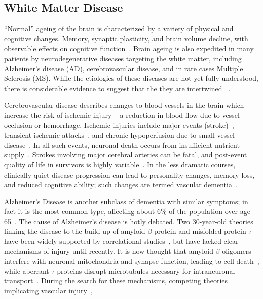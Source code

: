 \subsection{White Matter Disease}\label{ss:WMD}
``Normal'' ageing of the brain is characterized by a variety of physical and cognitive changes.
Memory, synaptic plasticity, and brain volume decline,
with observable effects on cognitive function~\cite{Peters2006,Good2002}.
Brain ageing is also expedited in many patients by neurodegenerative diseases
targeting the white matter, including
Alzheimer's disease (AD), cerebrovascular disease, and in rare cases Multiple Sclerosis (MS).
While the etiologies of these diseases are not yet fully understood,
there is considerable evidence to suggest that the they are intertwined
~\cite{Debette2010,Conklin2014,Heppner2015,Snyder2015}.
\par
Cerebrovascular disease describes changes to blood vessels in the brain which increase the risk of
ischemic injury -- a reduction in blood flow due to vessel occlusion or hemorrhage.
Ischemic injuries include
major events (stroke)~\cite{VanderWorp2007},
transient ischemic attacks~\cite{Albers2002}, and
chronic hypoperfusion due to small vessel disease~\cite{Pantoni2010}.
In all such events, neuronal death occurs from insufficient nutrient supply~\cite{VanderWorp2007}.
Strokes involving major cerebral arteries can be fatal,
and post-event quality of life in survivors is highly variable~\cite{Prabhakaran2015}.
In the less dramatic courses, clinically quiet disease progression can lead to
personality changes, memory loss, and reduced cognitive ability;
such changes are termed vascular dementia~\cite{Roman1993}.
\par
Alzheimer's Disease is another subclass of dementia with similar symptoms;
in fact it is the most common type,
affecting about 6\% of the population over age 65~\cite{Burns2009}.
The cause of Alzheimer's disease is hotly debated.
Two 30-year-old theories linking the disease to
the build up of amyloid $\beta$ protein and misfolded protein $\tau$
have been widely supported by correlational studies~\cite{Masters1985,Hardy2002,Lee2011},
but have lacked clear mechanisms of injury until recently.
It is now thought that amyloid $\beta$ oligomers interfere with
neuronal mitochondria and synapse function, leading to cell death~\cite{Kim2013,Tu2014},
while aberrant $\tau$ proteins disrupt microtubules
necessary for intraneuronal transport~\cite{Lee2011}.
During the search for these mechanisms, competing theories implicating
vascular injury~\cite{Snyder2015},
